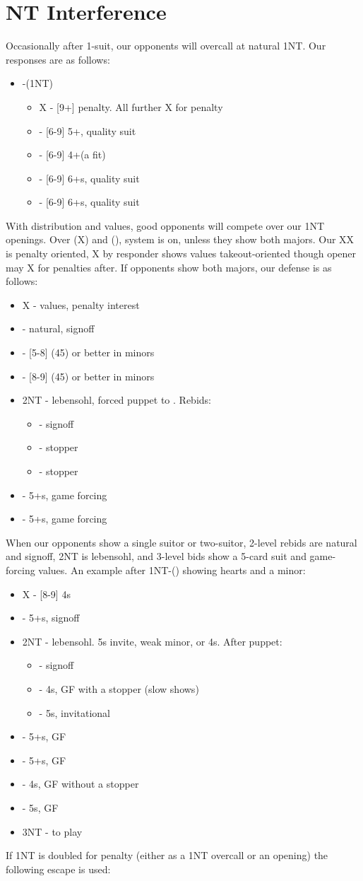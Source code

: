 \documentclass[12pt]{report}
\newcommand{\ul}[1]{\begin{itemize}#1\end{itemize}}
\newcommand{\li}{\item[~]}
\begin{document}
\newpage
\section{NT Interference} \label{3:4}

    Occasionally after 1-suit, our opponents will overcall at natural 1NT.  Our responses are as follows:

    \ul {
        \li {}-(1NT)
        \ul {
            \li X - [9+] penalty.  All further X for penalty
            \li \cl2 - [6-9] 5+\cl{}, quality suit
            \li \di2 - [6-9] 4+\di (a fit)
            \li \he2 - [6-9] 6+\he{}s, quality suit
            \li \sp2 - [6-9] 6+\sp{}s, quality suit
        }
    }

    With distribution and values, good opponents will compete over our 1NT openings.  Over (X) and (), system is on, unless they show both majors.  Our XX is penalty oriented, X by responder shows values takeout-oriented though opener may X for penalties after.  If opponents show both majors, our defense is as follows:

    \ul {
        \li X - values, penalty interest
        \li {} - natural, signoff
        \li \he2 - [5-8] (45) or better in minors
        \li \sp2 - [8-9] (45) or better in minors
        \li 2NT - lebensohl, forced puppet to \cl3.  Rebids:
        \ul {
            \li \di3 - signoff
            \li \he3 - stopper
            \li \sp3 - stopper
        }
        \li \cl3 - 5+\cl{}s, game forcing
        \li \di3 - 5+\di{}s, game forcing
    }

    When our opponents show a single suitor or two-suitor, 2-level rebids are natural and signoff, 2NT is lebensohl, and 3-level bids show a 5-card suit and game-forcing values.  An example after 1NT-() showing hearts and a minor:

    \ul {
        \li X - [8-9] 4\sp{}s
        \li {} - 5+\sp{}s, signoff
        \li 2NT - lebensohl.  5\sp{}s invite, weak minor, or 4\sp{}s.  After \cl3 puppet:
        \ul {
            \li \di3 - signoff
            \li \he3 - 4\sp{}s, GF with a stopper (slow shows)
            \li \sp3 - 5\sp{}s, invitational
        }

        \li \cl3 - 5+\cl{}s, GF
        \li \di3 - 5+\di{}s, GF
        \li \he3 - 4\sp{}s, GF without a stopper
        \li \sp3 - 5\sp{}s, GF
        \li 3NT - to play
    }

    If 1NT is doubled for penalty (either as a 1NT overcall or an opening) the following escape is used:
\end{document}

